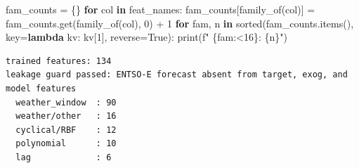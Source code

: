\documentclass[
  english,
  letterpaper,
]{scrbook}
\newenvironment{Shaded}{\begin{snugshade}}{\end{snugshade}}
\newcommand{\BuiltInTok}[1]{\textcolor[rgb]{0.00,0.23,0.31}{#1}}
\newcommand{\ControlFlowTok}[1]{\textcolor[rgb]{0.00,0.23,0.31}{\textbf{#1}}}
\newcommand{\DecValTok}[1]{\textcolor[rgb]{0.68,0.00,0.00}{#1}}
\newcommand{\KeywordTok}[1]{\textcolor[rgb]{0.00,0.23,0.31}{\textbf{#1}}}
\newcommand{\NormalTok}[1]{\textcolor[rgb]{0.00,0.23,0.31}{#1}}
\newcommand{\OperatorTok}[1]{\textcolor[rgb]{0.37,0.37,0.37}{#1}}
\newcommand{\SpecialCharTok}[1]{\textcolor[rgb]{0.37,0.37,0.37}{#1}}
\newcommand{\SpecialStringTok}[1]{\textcolor[rgb]{0.13,0.47,0.30}{#1}}
\newcommand{\VariableTok}[1]{\textcolor[rgb]{0.07,0.07,0.07}{#1}}
\begin{document}
\begin{Shaded}
\begin{Highlighting}[]
\NormalTok{fam\_counts }\OperatorTok{=}\NormalTok{ \{\}}
\ControlFlowTok{for}\NormalTok{ col }\KeywordTok{in}\NormalTok{ feat\_names:}
\NormalTok{    fam\_counts[family\_of(col)] }\OperatorTok{=}\NormalTok{ fam\_counts.get(family\_of(col), }\DecValTok{0}\NormalTok{) }\OperatorTok{+} \DecValTok{1}
\ControlFlowTok{for}\NormalTok{ fam, n }\KeywordTok{in} \BuiltInTok{sorted}\NormalTok{(fam\_counts.items(), key}\OperatorTok{=}\KeywordTok{lambda}\NormalTok{ kv: kv[}\DecValTok{1}\NormalTok{], reverse}\OperatorTok{=}\VariableTok{True}\NormalTok{):}
    \BuiltInTok{print}\NormalTok{(}\SpecialStringTok{f"  }\SpecialCharTok{\{}\NormalTok{fam}\SpecialCharTok{:\textless{}16\}}\SpecialStringTok{: }\SpecialCharTok{\{}\NormalTok{n}\SpecialCharTok{\}}\SpecialStringTok{"}\NormalTok{)}
\end{Highlighting}
\end{Shaded}

\begin{verbatim}
trained features: 134
leakage guard passed: ENTSO-E forecast absent from target, exog, and model features
  weather_window  : 90
  weather/other   : 16
  cyclical/RBF    : 12
  polynomial      : 10
  lag             : 6
\end{verbatim}
\end{document}
